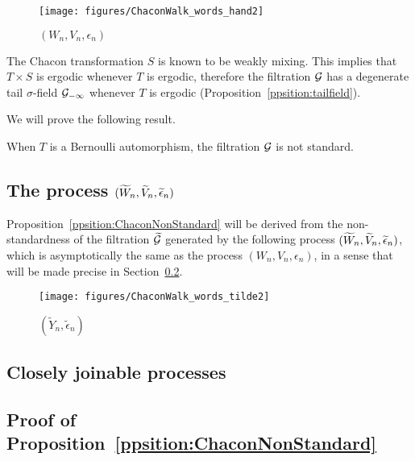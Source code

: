 \documentclass[12pt,a4paper]{article}
\begin{document}
\begin{figure}[!h]
\centering
	\texttt{[image: figures/ChaconWalk\_words\_hand2]}
\caption{$(W_n, V_n, \epsilon_n)$}
\label{fig:ChaconSplitWord}
\end{figure}

The Chacon transformation $S$ is known to be weakly mixing. 
This implies that $T \times S$ is ergodic whenever $T$ is ergodic, 
therefore the filtration $\mathcal{G}$ has a degenerate tail $\sigma$-field 
$\mathcal{G}_{-\infty}$ whenever $T$ is ergodic (Proposition~\ref{ppsition:tailfield}). 

We will prove the following result.

\begin{ppsition}\label{ppsition:ChaconNonStandard}
When $T$ is a Bernoulli automorphism, the filtration $\mathcal{G}$ is not standard.
\end{ppsition}


\subsection{The process $(\widetilde{W}_n, \widetilde{V}_n, \widetilde{\epsilon}_n)$}


Proposition~\ref{ppsition:ChaconNonStandard} will be derived from the 
non-standardness of the filtration $\widetilde{\mathcal{G}}$ generated by 
the following process $(\widetilde{W}_n, \widetilde{V}_n, \widetilde{\epsilon}_n)$, 
which is asymptotically the same as the process $(W_n, V_n, \epsilon_n)$, 
in a sense that will be made precise in Section~\ref{sec:joinable}.



\begin{figure}[!h]
\centering
	\texttt{[image: figures/ChaconWalk\_words\_tilde2]}
\caption{$(\widetilde{Y}_n, \widetilde{\epsilon}_n)$}
\label{fig:tildeWn}
\end{figure}



\subsection{Closely joinable processes}\label{sec:joinable}


\subsection{Proof of Proposition~\ref{ppsition:ChaconNonStandard}}
\end{document}
